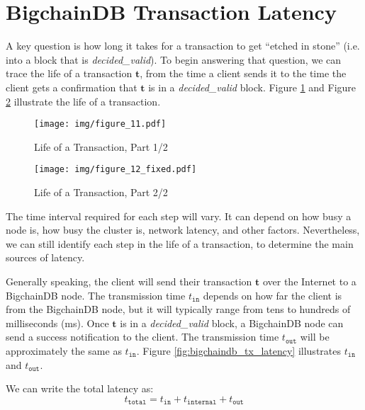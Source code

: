 \section{BigchainDB Transaction Latency}\label{sec:latency}

A key question is how long it takes for a transaction to get “etched in stone” (i.e. into a block that is \textsf{\textit{decided\_valid}}). 
To begin answering that question, we can trace the life of a transaction $\mathbf{t}$, from the time a client sends it to the time the client gets a confirmation that $\mathbf{t}$ is in a \textsf{\textit{decided\_valid}} block. 
Figure \ref{fig:bigchaindb_tx_life_1} and Figure \ref{fig:bigchaindb_tx_life_2} illustrate the life of a transaction.

\begin{figure}[!ht]
  \centering
  \texttt{[image: img/figure\_11.pdf]}
  \caption{Life of a Transaction, Part 1/2}
  \label{fig:bigchaindb_tx_life_1}
\end{figure}

\begin{figure}[!ht]
  \centering
  \texttt{[image: img/figure\_12\_fixed.pdf]}
  \caption{Life of a Transaction, Part 2/2}
  \label{fig:bigchaindb_tx_life_2}
\end{figure}

The time interval required for each step will vary. 
It can depend on how busy a node is, how busy the cluster is, network latency, and other factors. 
Nevertheless, we can still identify each step in the life of a transaction, to determine the main sources of latency.

Generally speaking, the client will send their transaction $\mathbf{t}$ over the Internet to a BigchainDB node. 
The transmission time $t_{\mathtt{in}}$ depends on how far the client is from the BigchainDB node, but it will typically range from tens to hundreds of milliseconds (ms). 
Once $\mathbf{t}$ is in a \textsf{\textit{decided\_valid}} block, a BigchainDB node can send a success notification to the client. 
The transmission time $t_{\mathtt{out}}$ will be approximately the same as $t_{\mathtt{in}}$. 
Figure \ref{fig:bigchaindb_tx_latency} illustrates $t_{\mathtt{in}}$ and $t_{\mathtt{out}}$.

We can write the total latency as:
\begin{equation}
  t_\mathtt{total} = t_{\mathtt{in}} + t_{\mathtt{internal}} + t_{\mathtt{out}}
\end{equation}

